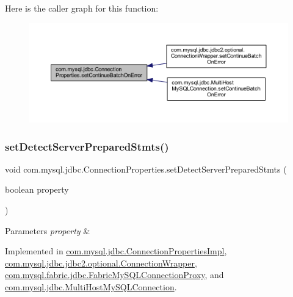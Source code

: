Here is the caller graph for this function\+:\nopagebreak
\begin{figure}[H]
\begin{center}
\leavevmode
\includegraphics[width=350pt]{interfacecom_1_1mysql_1_1jdbc_1_1_connection_properties_a5f3f94fedf8c3162e2b825279a9d01ed_icgraph}
\end{center}
\end{figure}
\mbox{\label{interfacecom_1_1mysql_1_1jdbc_1_1_connection_properties_aadfec3198248406f73aea1a634fc3839}} 
\subsubsection{\texorpdfstring{set\+Detect\+Server\+Prepared\+Stmts()}{setDetectServerPreparedStmts()}}
{\footnotesize\ttfamily void com.\+mysql.\+jdbc.\+Connection\+Properties.\+set\+Detect\+Server\+Prepared\+Stmts (\begin{DoxyParamCaption}\item[{boolean}]{property }\end{DoxyParamCaption})}


\begin{DoxyParams}{Parameters}
{\em property} & \\
\hline
\end{DoxyParams}


Implemented in \mbox{\hyperlink{classcom_1_1mysql_1_1jdbc_1_1_connection_properties_impl_aa0b17bd1412f33072d6bbc81a7686c2a}{com.\+mysql.\+jdbc.\+Connection\+Properties\+Impl}}, \mbox{\hyperlink{classcom_1_1mysql_1_1jdbc_1_1jdbc2_1_1optional_1_1_connection_wrapper_a0c80fd9ac23df453f078c771d7b88760}{com.\+mysql.\+jdbc.\+jdbc2.\+optional.\+Connection\+Wrapper}}, \mbox{\hyperlink{classcom_1_1mysql_1_1fabric_1_1jdbc_1_1_fabric_my_s_q_l_connection_proxy_a4ecda277294f8d37b14e252d78a7062b}{com.\+mysql.\+fabric.\+jdbc.\+Fabric\+My\+S\+Q\+L\+Connection\+Proxy}}, and \mbox{\hyperlink{classcom_1_1mysql_1_1jdbc_1_1_multi_host_my_s_q_l_connection_a9bc00ee02ec2cb57883a27ac982ed215}{com.\+mysql.\+jdbc.\+Multi\+Host\+My\+S\+Q\+L\+Connection}}.

